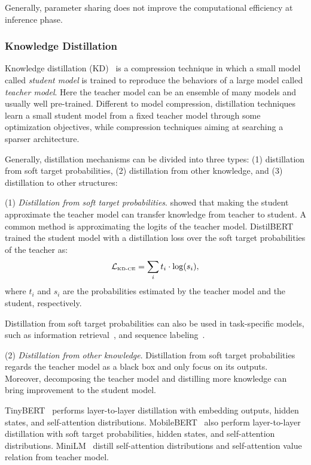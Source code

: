 \documentclass[fleqn]{SCYE-arxiv}
\begin{document}
\begin{multicols}{2}
Generally, parameter sharing does not improve the computational efficiency at inference phase.

\subsubsection{Knowledge Distillation}

Knowledge distillation (KD)~\cite{hinton2015distilling} is a compression technique in which a small model called \textit{student model} is trained to reproduce the behaviors of a large model called \textit{teacher model}. Here the teacher model can be an ensemble of many models and usually well pre-trained. Different to model compression, distillation techniques learn a small student model from a fixed teacher model through some optimization objectives, while compression techniques aiming at searching a sparser architecture.

Generally, distillation mechanisms can be divided into three types: (1) distillation from soft target probabilities, (2) distillation from other knowledge, and (3) distillation to other structures:

(1) \textit{Distillation from soft target probabilities}.
\citet{bucilua2006model} showed that making the student approximate the teacher model can transfer knowledge from teacher to student. A common method is approximating the logits of the teacher model. DistilBERT~\cite{sanh2019distilbert} trained the student model with a distillation loss over the soft target probabilities of the teacher as:
\begin{align}\label{eq:distillation}
\mathcal{L}_{\textrm{\tiny KD-CE}}=\sum_{i}{t_i \cdot \mathrm{log}(s_i )},
\end{align}
where $t_i$ and $s_i$ are the probabilities estimated by the teacher model and the student, respectively.

Distillation from soft target probabilities can also be used in task-specific models, such as information retrieval~\cite{lu2020twinbert}, and sequence labeling~\cite{tsai-etal-2019-small}.



(2) \textit{Distillation from other knowledge}.
Distillation from soft target probabilities regards the teacher model as a black box and only focus on its outputs. Moreover, decomposing the teacher model and distilling more knowledge can bring improvement to the student model.

TinyBERT~\cite{jiao2019tinybert} performs layer-to-layer distillation with embedding outputs, hidden states, and self-attention distributions.    MobileBERT~\cite{sun2020mobilebert} also perform layer-to-layer distillation with soft target probabilities, hidden states, and self-attention distributions. MiniLM~\cite{wang2020minilm} distill self-attention distributions and self-attention value relation from teacher model.


\end{multicols}
\end{document}
